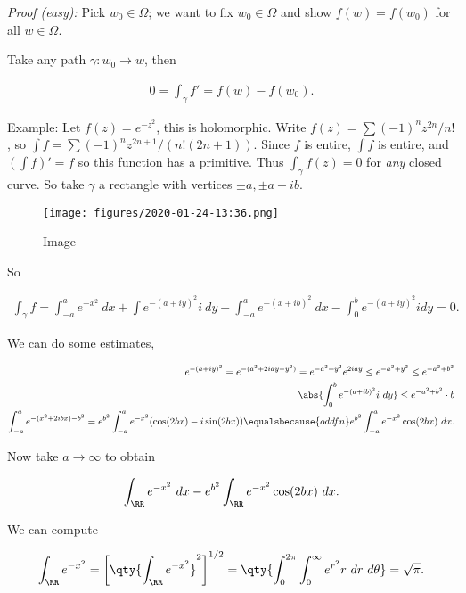 \emph{Proof (easy):} Pick \(w_0 \in \Omega\); we want to fix
\(w_0 \in \Omega\) and show \(f(w) = f(w_0)\) for all \(w\in \Omega\).

Take any path \(\gamma: w_0 \to w\), then

\begin{align*}
0 = \int_\gamma f' = f(w) - f(w_0)
.\end{align*}

Example: Let \(f(z) = e^{-z^2}\), this is holomorphic. Write
\(f(z) = \sum (-1)^n z^{2n}/n!\), so
\(\int f = \sum (-1)^n z^{2n+1}/(n! (2n+1))\). Since \(f\) is entire,
\(\int f\) is entire, and \((\int f)' = f\) so this function has a
primitive. Thus \(\int_\gamma f(z) = 0\) for \emph{any} closed curve. So
take \(\gamma\) a rectangle with vertices \(\pm a , \pm a + ib\).

\begin{figure}
\centering
\texttt{[image: figures/2020-01-24-13:36.png]}
\caption{Image}
\end{figure}

So

\begin{align*}
\int_\gamma f = \int_{-a}^a e^{-x^2} ~dx + \int e^{-(a+iy)^2} i ~dy - \int_{-a}^a e^{-(x+ib)^2} ~dx - \int_0^b e^{-(a+iy)^2} i dy = 0
.\end{align*}

We can do some estimates,

\begin{align*}
e^{-(a+iy)^2} = e^{-(a^2 + 2iay - y^2)} = e^{-a^2 + y^2} e^{2iay} \leq e^{-a^2 + y^2} \leq e^{-a^2 + b^2} \\
\abs {\int_0^b e^{-(a+ib)^2} i ~dy} \leq e^{-a^2 + b^2} \cdot b \\
\int_{-a}^a e^{-(x^2 + 2ib x)-b^2} = e^{b^2} \int_{-a}^a e^{-x^2} ( \cos(2bx) - i \sin(2bx) ) \equalsbecause{odd fn} e^{b^2} \int_{-a}^a e^{-x^2} \cos(2bx) ~dx
.\end{align*}

Now take \(a\to \infty\) to obtain

\begin{align*}
\int_\RR e^{-x^2} ~dx - e^{b^2} \int_\RR e^{-x^2} \cos(2bx) ~dx
.\end{align*}

We can compute

\begin{align*}
\int_\RR e^{-x^2} = \left[ \qty{\int_\RR e^{-x^2}}^2 \right]^{1/2} = \qty{ \int_0^{2\pi} \int_0^\infty e^{r^2} r~dr~d\theta} = \sqrt{\pi}
.\end{align*}


